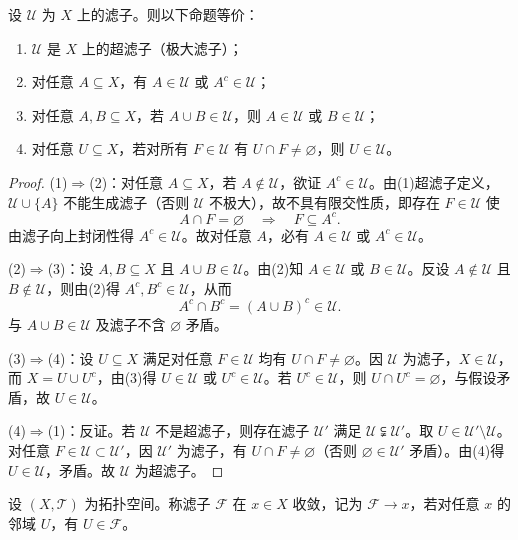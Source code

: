 \documentclass[lang=cn,a4paper,newtx,figureplace=section,tableplace=section]{elegantbook}
\begin{document}
  \begin{proposition}[超滤子的等价性质]\label{prop:ultrafilter-properties}
  设 $\mathcal U$ 为 $X$ 上的滤子。则以下命题等价：
  \begin{enumerate}
    \item $\mathcal U$ 是 $X$ 上的超滤子（极大滤子）；
    \item 对任意 $A\subseteq X$，有 $A\in\mathcal U$ 或 $A^c\in\mathcal U$；
    \item 对任意 $A,B\subseteq X$，若 $A\cup B\in\mathcal U$，则 $A\in\mathcal U$ 或 $B\in\mathcal U$；
    \item 对任意 $U\subseteq X$，若对所有 $F\in\mathcal U$ 有 $U\cap F\neq\varnothing$，则 $U\in\mathcal U$。
  \end{enumerate}
  \end{proposition}

  \begin{proof}
  (1)$\Rightarrow$(2)：对任意 $A\subseteq X$，若 $A\notin\mathcal U$，欲证 $A^c\in\mathcal U$。由(1)超滤子定义，$\mathcal U\cup\{A\}$ 不能生成滤子（否则 $\mathcal U$ 不极大），故不具有限交性质，即存在 $F\in\mathcal U$ 使
  \[
  A\cap F=\varnothing\quad\Longrightarrow\quad F\subseteq A^c.
  \]
  由滤子向上封闭性得 $A^c\in\mathcal U$。故对任意 $A$，必有 $A\in\mathcal U$ 或 $A^c\in\mathcal U$。
  
  (2)$\Rightarrow$(3)：设 $A,B\subseteq X$ 且 $A\cup B\in\mathcal U$。由(2)知 $A\in\mathcal U$ 或 $B\in\mathcal U$。反设 $A\notin\mathcal U$ 且 $B\notin\mathcal U$，则由(2)得 $A^c,B^c\in\mathcal U$，从而
  \[
  A^c\cap B^c=(A\cup B)^c\in\mathcal U.
  \]
  与 $A\cup B\in\mathcal U$ 及滤子不含 $\varnothing$ 矛盾。
  
  (3)$\Rightarrow$(4)：设 $U\subseteq X$ 满足对任意 $F\in\mathcal U$ 均有 $U\cap F\ne\varnothing$。因 $\mathcal U$ 为滤子，$X\in\mathcal U$，而 $X=U\cup U^c$，由(3)得 $U\in\mathcal U$ 或 $U^c\in\mathcal U$。若 $U^c\in\mathcal U$，则 $U\cap U^c=\varnothing$，与假设矛盾，故 $U\in\mathcal U$。
  
  (4)$\Rightarrow$(1)：反证。若 $\mathcal U$ 不是超滤子，则存在滤子 $\mathcal U'$ 满足 $\mathcal U\subsetneqq\mathcal U'$。取 $U\in\mathcal U'\setminus\mathcal U$。对任意 $F\in\mathcal U\subset\mathcal U'$，因 $\mathcal U'$ 为滤子，有 $U\cap F\ne\varnothing$（否则 $\varnothing\in\mathcal U'$ 矛盾）。由(4)得 $U\in\mathcal U$，矛盾。故 $\mathcal U$ 为超滤子。
  \end{proof}

  \begin{definition}[滤子的收敛]\label{def:filter-convergence-2}
  设 $(X,\mathcal T)$ 为拓扑空间。称滤子 $\mathcal F$ 在 $x\in X$ 收敛，记为 $\mathcal F\to x$，若对任意 $x$ 的邻域 $U$，有 $U\in\mathcal F$。
  \end{definition}
  
\end{document}

